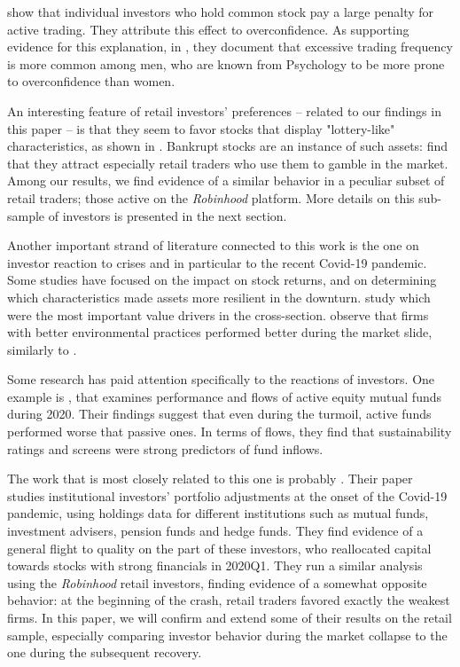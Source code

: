 \documentclass[12pt]{article}
\numberwithin{equation}{section} %
\begin{document}
 \cite{Barber_2000} show that individual investors who hold common stock pay a large penalty for active trading. They attribute this effect to overconfidence. As supporting evidence for this explanation, in \cite{Barber_2001}, they document that excessive trading frequency is more common among men, who are known from Psychology to be more prone to overconfidence than women.

An interesting feature of retail investors' preferences -- related to our findings in this paper -- is that they seem to favor stocks that display "lottery-like" characteristics, as shown in \cite{Han_2013}. Bankrupt stocks are an instance of such assets: \cite*{Coelho_2014} find that they attract especially retail traders who use them to gamble in the market. Among our results, we find evidence of a similar behavior in a peculiar subset of retail traders; those active on the \textit{Robinhood} platform. More details on this sub-sample of investors is presented in the next section.

Another important strand of literature connected to this work is the one on investor reaction to crises and in particular to the recent Covid-19 pandemic. Some studies have focused on the impact on stock returns, and on determining which characteristics made assets more resilient in the downturn. \cite{Ramelli_2020} study which were the most important value drivers in the cross-section. \cite*{albuquerque2020} observe that firms with better environmental practices performed better during the market slide, similarly to \cite{Garel_2020}.

Some research has paid attention specifically to the reactions of investors. One example is \cite{pastor2020mutual}, that examines performance and flows of active equity mutual funds during 2020. Their findings suggest that even during the turmoil, active funds performed worse that passive ones. In terms of flows, they find that sustainability ratings and screens were strong predictors of fund inflows.

The work that is most closely related to this one is probably \cite*{Glossner2020}. Their paper studies institutional investors' portfolio adjustments at the onset of the Covid-19 pandemic, using holdings data for different institutions such as mutual funds, investment advisers, pension funds and hedge funds. They find evidence of a general flight to quality on the part of these investors, who reallocated capital towards stocks with strong financials in 2020Q1. They run a similar analysis using the \textit{Robinhood} retail investors, finding evidence of a somewhat opposite behavior: at the beginning of the crash, retail traders favored exactly the weakest firms. In this paper, we will confirm and extend some of their results on the retail sample, especially comparing investor behavior during the market collapse to the one during the subsequent recovery.
\end{document}
